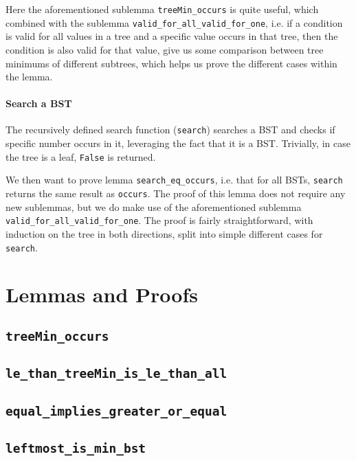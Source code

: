 \documentclass[a4paper]{article}
\begin{document}
Here the aforementioned sublemma \texttt{treeMin\_occurs} is quite useful, which combined with the sublemma \texttt{valid\_for\_all\_valid\_for\_one}, i.e. if a condition is valid for all values in a tree and a specific value occurs in that tree, then the condition is also valid for that value, give us some comparison between tree minimums of different subtrees, which helps us prove the different cases within the lemma.



\paragraph{Search a BST}

The recursively defined search function (\texttt{search}) searches a BST and checks if specific number occurs in it, leveraging the fact that it is a BST. Trivially, in case the tree is a leaf, \texttt{False} is returned.



We then want to prove lemma \texttt{search\_eq\_occurs}, i.e. that for all BSTs, \texttt{search} returns the same result as \texttt{occurs}. The proof of this lemma does not require any new sublemmas, but we do make use of the aforementioned sublemma \texttt{valid\_for\_all\_valid\_for\_one}. The proof is fairly straightforward, with induction on the tree in both directions, split into simple different cases for \texttt{search}.



\newpage
\appendix\section{Lemmas and Proofs}

\subsection{\texttt{treeMin\_occurs}}
\label{a:treeMinOccurs}


\subsection{\texttt{le\_than\_treeMin\_is\_le\_than\_all}}
\label{a:leThanTreeMinIsLeThanAll}


\subsection{\texttt{equal\_implies\_greater\_or\_equal}}
\label{a:equalImpliesGreaterOrEqual}


\subsection{\texttt{leftmost\_is\_min\_bst}}
\label{a:leftmostIsMinBst}

 
\end{document}
